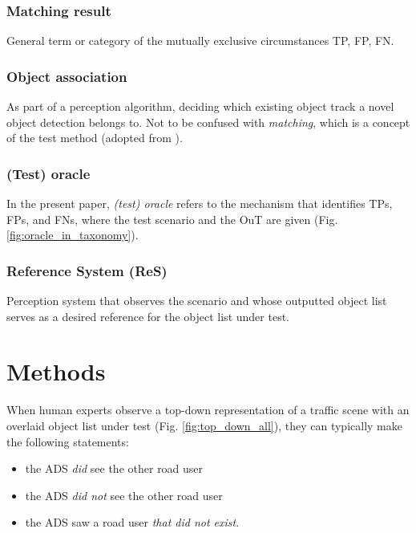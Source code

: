 \documentclass[conference]{IEEEtran}
\begin{document}
\subsubsection{Matching result} \label{def:matching_result} General term or category of the mutually exclusive circumstances TP, FP, FN.  



\subsubsection{Object association} \label{def:association} As part of a perception algorithm, deciding which existing object track a novel object detection belongs to. Not to be confused with \textit{matching}, which is a concept of the test method (adopted from \cite{Luiten2020hota}).

\subsubsection{(Test) oracle} \label{def:oracle} 
In the present paper, \textit{(test) oracle} refers to the mechanism that identifies TPs, FPs, and FNs, where the test scenario and the OuT are given (Fig. \ref{fig:oracle_in_taxonomy}).

\subsubsection{Reference System (ReS)}
\label{def:reference_system}
Perception system that observes the scenario and whose outputted object list serves as a desired reference for the object list under test. 



\section{Methods}
\label{sec:method}


When human experts observe a top-down representation of a traffic scene with an overlaid object list under test (Fig. \ref{fig:top_down_all}), they can typically make the following statements:
\begin{itemize}
	\item the ADS \textit{did} see the other road user
	\item the ADS \textit{did not} see the other road user 
	\item the ADS saw a road user \textit{that did not exist}.
\end{itemize}
\end{document}

